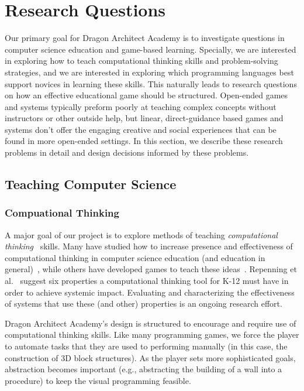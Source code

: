 \documentclass{sig-alternate}
\newcommand{\gametitle}{{\color{RoyalPurple} Dragon Architect Academy}}
\begin{document}
\section{Research Questions}
\label{sec:research}

Our primary goal for \gametitle{} is to investigate questions in computer science education and game-based learning. 
Specially, we are interested in exploring how to teach computational thinking skills and problem-solving strategies, and we are interested in exploring which programming languages best support novices in learning these skills. 
This naturally leads to research questions on how an effective educational game should be structured.
Open-ended games and systems typically preform poorly at teaching complex concepts without instructors or other outside help, but linear, direct-guidance based games and systems don't offer the engaging creative and social experiences that can be found in more open-ended settings.
In this section, we describe these research problems in detail and design decisions informed by these problems.

\subsection{Teaching Computer Science}

\subsubsection{Compuational Thinking}

A major goal of our project is to explore methods of teaching \emph{computational thinking}~\cite{wing2008computational} skills.
Many have studied how to increase presence and effectiveness of computational thinking in computer science education (and education in general)~\cite{barr2011bringing, lye2014review},
while others have developed games to teach these ideas~\cite{weintrop2013robobuilder, kazimoglu2012serious}. 
Repenning et al.~\cite{repenning2010scalable} suggest six properties a computational thinking tool for K-12 must have in order to achieve systemic impact. 
Evaluating and characterizing the effectiveness of systems that use these (and other) properties is an ongoing research effort.

\gametitle{}'s design is structured to encourage and require use of computational thinking skills.
Like many programming games, we force the player to automate tasks that they are used to performing manually (in this case, the construction of 3D block structures).
As the player sets more sophisticated goals, abstraction becomes important (e.g., abstracting the building of a wall into a procedure) to keep the visual programming feasible. 
\end{document}
